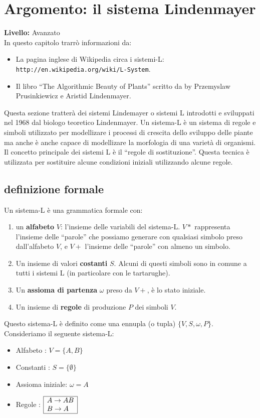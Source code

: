 \chapter{Argomento: il sistema Lindenmayer}
{ }\hfill\textbf{Livello:} Avanzato \\


In questo capitolo trarrò informazioni da:
\begin{itemize}
 \item La pagina inglese di Wikipedia circa i sistemi-L: \texttt{http://en.wikipedia.org/wiki/L-System}.
 \item Il libro ``The Algorithmic Beauty of Plants'' scritto da by Przemyslaw Prusinkiewicz e Aristid Lindenmayer.
\end{itemize}

Questa sezione tratterà dei sistemi Lindemayer o sistemi L introdotti e sviluppati nel 1968 dal biologo teoretico Lindenmayer. Un sistema-L è un sistema di regole e simboli utilizzato per modellizare i processi di crescita dello sviluppo delle piante ma anche è anche capace di modellizare la morfologia di una varietà di organismi. Il concetto principale dei sistemi L è il ``regole di sostituzione''. Questa tecnica è utilizzata per sostituire alcune condizioni iniziali utilizzando alcune regole.


\section{definizione formale}
Un sistema-L è una grammatica formale con:
\begin{enumerate}
 \item un \textbf{alfabeto} $V$: l'insieme delle variabili del sistema-L. $V *$ rappresenta l'insieme delle ``parole'' che possiamo generare con qualsiasi simbolo preso dall'alfabeto $V$, e $V +$ l'insieme delle ``parole'' con almeno un simbolo.
 \item Un insieme di valori \textbf{costanti} $S$. Alcuni di questi simboli sono in comune a tutti i sistemi L (in particolare con le tartarughe).
  \item Un \textbf{assioma di partenza} $\omega$ preso da $V +$, è lo stato iniziale.
 \item Un insieme di \textbf{regole} di produzione $P$ dei simboli $V$.
\end{enumerate}
Questo sistema-L è definito come una ennupla (o tupla) $\{V,S,\omega,P\}$.\\

Consideriamo il seguente sistema-L:
\begin{itemize}
	\item Alfabeto : $V = \{A, B\}$
	\item Constanti : $S = \{\emptyset\}$
	\item Assioma iniziale: $\omega = A$
	\item Regole : $\begin{array}{|l|}
	\hline
	A \rightarrow AB \\
	B \rightarrow A \\ 
	\hline
\end{array}
$
\end{itemize}

